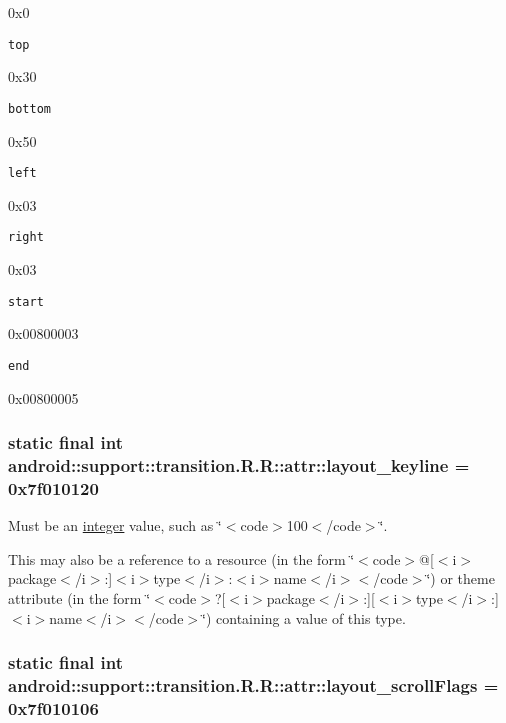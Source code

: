 0x0

{\tt top}

0x30

{\tt bottom}

0x50

{\tt left}

0x03

{\tt right}

0x03

{\tt start}

0x00800003

{\tt end}

0x00800005\hypertarget{classandroid_1_1support_1_1transition_1_1_r_1_1attr_96d91081a86d6ce37a0299619ec50dce}{
\subsubsection[{layout\_\-keyline}]{\setlength{\rightskip}{0pt plus 5cm}static final int android::support::transition.R.R::attr::layout\_\-keyline = 0x7f010120}}
\label{classandroid_1_1support_1_1transition_1_1_r_1_1attr_96d91081a86d6ce37a0299619ec50dce}


Must be an \hyperlink{classandroid_1_1support_1_1transition_1_1_r_1_1integer}{integer} value, such as \char`\"{}$<$code$>$100$<$/code$>$\char`\"{}. 

This may also be a reference to a resource (in the form \char`\"{}$<$code$>$@\mbox{[}$<$i$>$package$<$/i$>$:\mbox{]}$<$i$>$type$<$/i$>$:$<$i$>$name$<$/i$>$$<$/code$>$\char`\"{}) or theme attribute (in the form \char`\"{}$<$code$>$?\mbox{[}$<$i$>$package$<$/i$>$:\mbox{]}\mbox{[}$<$i$>$type$<$/i$>$:\mbox{]}$<$i$>$name$<$/i$>$$<$/code$>$\char`\"{}) containing a value of this type. \hypertarget{classandroid_1_1support_1_1transition_1_1_r_1_1attr_f76067fdd760ff68167015055feb3c93}{
\subsubsection[{layout\_\-scrollFlags}]{\setlength{\rightskip}{0pt plus 5cm}static final int android::support::transition.R.R::attr::layout\_\-scrollFlags = 0x7f010106}}
\label{classandroid_1_1support_1_1transition_1_1_r_1_1attr_f76067fdd760ff68167015055feb3c93}


